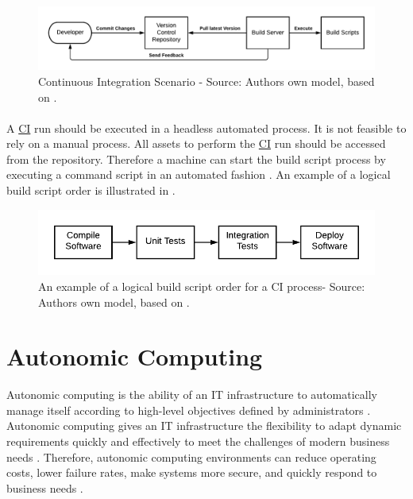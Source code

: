\begin{figure}[h]
\centering
\includegraphics[scale=0.7]{images/02_theoretical_foundation/deployment_pipeline/ci_scenario}
\caption{Continuous Integration Scenario - Source: Authors own model, based on \cite{Duvall2007CI}.}
\label{fig:02_foundation_deployment_ci_scenario}
\end{figure}


\paragraph{}A \hyperlink{abbr:ci}{CI} run should be executed in a headless automated process. It is not feasible to rely on a manual process.
All assets to perform the \hyperlink{abbr:ci}{CI} run should be accessed from the repository. Therefore a machine can start the build script process by executing a command script in an automated fashion \cite{Duvall2007CI}.
An example of a logical build script order is illustrated in .


\begin{figure}[h]
\centering
\includegraphics[scale=1]{images/02_theoretical_foundation/deployment_pipeline/ci_build_script_order}
\caption{An example of a logical build script order for a CI process- Source: Authors own model, based on \cite{Duvall2007CI}.}
\label{fig:02_foundation_deployment_ci_script-order}
\end{figure}


\section{Autonomic Computing}
\label{sec:02_ac}
Autonomic computing is the ability of an IT infrastructure to automatically manage itself according to high-level objectives defined by administrators \cite{Kephart2003VisionComputing}.
Autonomic computing gives an IT infrastructure the flexibility to adapt dynamic requirements quickly and effectively to meet the challenges of modern business needs \cite{Murch2004Autonomic}. Therefore, autonomic computing environments can reduce operating costs, lower failure rates, make systems more secure, and quickly respond to business needs \cite{Jacob2004AutonomicSolution}.


